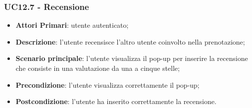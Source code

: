 \subsubsection{UC12.7 - Recensione}
\begin{itemize}
	\item \textbf{Attori Primari}: utente autenticato;
	\item \textbf{Descrizione}: l'utente recensisce l'altro utente coinvolto nella prenotazione;
	\item \textbf{Scenario principale}: l'utente visualizza il pop-up per inserire la recensione che consiste in una valutazione da una a cinque stelle;
	\item \textbf{Precondizione}: l'utente visualizza correttamente il pop-up;
	\item \textbf{Postcondizione}: l'utente ha inserito correttamente la recensione.
\end{itemize}

